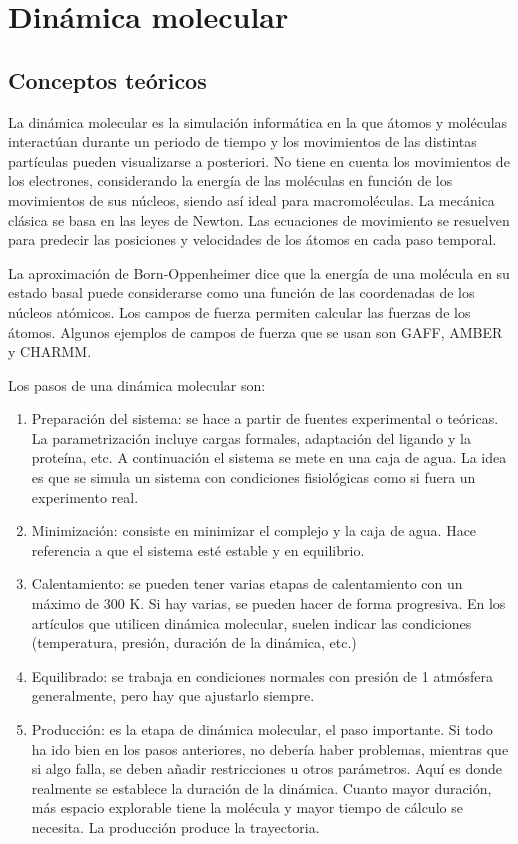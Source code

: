 \chapter{Dinámica molecular}
\section{Conceptos teóricos}
La dinámica molecular es la simulación informática en la que átomos y moléculas interactúan durante un periodo de tiempo y los movimientos de las distintas partículas pueden visualizarse a posteriori. No tiene en cuenta los movimientos de los electrones, considerando la energía de las moléculas en función de los movimientos de sus núcleos, siendo así ideal para macromoléculas. La mecánica clásica se basa en las leyes de Newton. Las ecuaciones de movimiento se resuelven para predecir las posiciones y velocidades de los átomos en cada paso temporal.

La aproximación de Born-Oppenheimer dice que la energía de una molécula en su estado basal puede considerarse como una función de las coordenadas de los núcleos atómicos. Los campos de fuerza permiten calcular las fuerzas de los átomos. Algunos ejemplos de campos de fuerza que se usan son GAFF, AMBER y CHARMM.

Los pasos de una dinámica molecular son:
\begin{enumerate}
\item Preparación del sistema: se hace a partir de fuentes experimental o teóricas. La parametrización incluye cargas formales, adaptación del ligando y la proteína, etc. A continuación el sistema se mete en una caja de agua. La idea es que se simula un sistema con condiciones fisiológicas como si fuera un experimento real.
\item Minimización: consiste en minimizar el complejo y la caja de agua. Hace referencia a que el sistema esté estable y en equilibrio.
\item Calentamiento: se pueden tener varias etapas de calentamiento con un máximo de 300 K. Si hay varias, se pueden hacer de forma progresiva. En los artículos que utilicen dinámica molecular, suelen indicar las condiciones (temperatura, presión, duración de la dinámica, etc.)
\item Equilibrado: se trabaja en condiciones normales con presión de 1 atmósfera generalmente, pero hay que ajustarlo siempre.
\item Producción: es la etapa de dinámica molecular, el paso importante. Si todo ha ido bien en los pasos anteriores, no debería haber problemas, mientras que si algo falla, se deben añadir restricciones u otros parámetros. Aquí es donde realmente se establece la duración de la dinámica. Cuanto mayor duración, más espacio explorable tiene la molécula y mayor tiempo de cálculo se necesita. La producción produce la trayectoria.
\end{enumerate}

